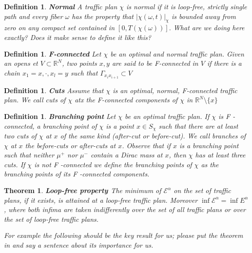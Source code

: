 \documentclass[12pt,a4paper]{article}
\numberwithin{equation}{section}
\theoremstyle{mytheorem}
\newtheorem{theorem}[subsection]{Theorem}
\newtheorem{definition}[subsubsection]{Definition}
\theoremstyle{myremark}
\theoremstyle{myparagraph}
\newcommand{\R}{\mathbb{R}}
\begin{document}
    \begin{definition}
        \textbf{Normal}
        A traffic plan $\chi$ is normal if it is loop-free, strictly single path and every fiber $\omega$
        has the property that $| \chi(\omega, t)|_\chi$ is bounded away from zero on any compact set contained in $[0, T(\chi(\omega))]$.
            {\color{teal} What are we doing here exactly? Does it make sense to define it like this?}
    \end{definition}

    \begin{definition}
        \textbf{F-connected}
        Let $\chi$ be an optimal and normal traffic plan. Given an opens et $V \subset \R^N$, two points $x,y$ are said to be F-connected in $V$
        if there is a chain $x_1=x,\cdot, x_l= y$ such that $\Gamma_{x_{i}x_{i+1}} \subset V$
    \end{definition}

    \begin{definition}
        \textbf{Cuts}
        Assume that $\chi$ is an optimal, normal, F-connected traffic plan. We call cuts of $\chi$ atx the F-connected components of
        $\chi$ in $\R^N \setminus \{x\}$
    \end{definition}

    \begin{definition}
        \textbf{Branching point}
        Let $\chi$ be an optimal traffic plan. If $\chi$ is F -connected, a branching point of $\chi$ is a point $x \in S_{\chi}$ such that
        there are at least two cuts of $\chi$ at $x$ of the same kind (after-cut or before-cut).
        We call branches of $\chi$ at $x$ the before-cuts or after-cuts at $x$.
        Observe that if $x$ is a branching point such that neither $\mu^+$ nor $\mu^-$ contain a Dirac mass at $x$, then $\chi$ has at least
        three cuts.
        If $\chi$ is not F -connected we define the branching points of $\chi$ as the branching points of its F -connected components.
    \end{definition}



    \begin{theorem}
        \textbf{Loop-free property \cite[Proposition 4.9]{Bernot}}
        \label{lemma:loop_free}
        The minimum of $\mathcal{E}^{\alpha}$ on the set of traffic plans, if it exists, is attained
        at a loop-free traffic plan. Moreover $\inf\mathcal{E}^{\alpha} =\inf E^\alpha$, where both
        infima are taken indifferently over the set of all traffic plans or over the set of loop-free traffic
        plans.

            {\color{red} For example the following should be the key result for us; please put the theorem in and say a sentence about its importance for us.}
    \end{theorem}
\end{document}
